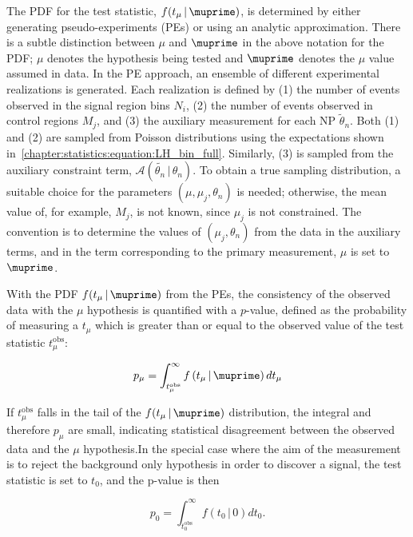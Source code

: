 The PDF for the test statistic, $f(t_{\mu}\,|\,\muprime)$,
is determined by either generating pseudo-experiments (PEs) or using
an analytic approximation. There is a subtle distinction between $\mu$
and $\muprime$
in the above notation for the PDF; $\mu$ denotes the hypothesis being tested and
$\muprime$ denotes the $\mu$ value assumed in data. In the PE
approach, an ensemble
of different experimental realizations is generated. Each realization
is defined by (1) the number of events observed in the signal region
bins $N_i$, (2) the number of events observed in control regions
$M_j$, and (3) the auxiliary measurement for each NP
$\tilde{\theta}_n$. Both (1) and (2) are sampled from Poisson
distributions using the expectations shown
in~\ref{chapter:statistics:equation:LH_bin_full}. Similarly, (3) is sampled from the auxiliary
constraint term, $\mathscr{A}(\tilde{\theta_n}\,|\,\theta_n)$. To obtain a
true sampling distribution, a suitable choice for the parameters
$(\mu,\mu_j,\theta_n)$ is needed; otherwise, the mean value of, for
example, $M_j$, is not known, since $\mu_j$ is not
constrained. The convention is to determine the values of
$(\mu_j,\theta_n)$ from the data in the auxiliary terms, and in the
term corresponding to the primary measurement, $\mu$ is set to
$\muprime$.

With the PDF $f(t_{\mu}\,|\,\muprime)$ from the PEs, the
consistency of the observed data with the $\mu$
hypothesis is quantified with a $p$-value, defined as the probability
of measuring a $t_{\mu}$ which is greater than or equal to the
observed value of the test statistic
$t_{\mu}^{\textrm{obs}}$:

\begin{equation}
p_{\mu} = \int_{t_{\mu}^{\textrm{obs}}}^{\infty}
f\left(t_{\mu}\,|\,\muprime\right) dt_{\mu}
\label{chap:statistics:equation:p_value}
\end{equation}

\noindent
If $t_{\mu}^{\textrm{obs}}$ falls in the tail of the
$f(t_{\mu}\,|\,\muprime)$ distribution, the integral and therefore
$p_{\mu}$ are small, indicating statistical disagreement
between the observed data and the $\mu$ hypothesis.In the special case
where the aim of the measurement is to reject the
background only hypothesis in order to discover a signal, the test
statistic is set to $t_0$, and the p-value is then

\begin{equation}
p_0 = \int_{t_{0}^{\textrm{obs}}}^{\infty}
f\left(t_{0}\,|\,0\right) dt_0.
\label{chap:statistics:equation:p_value_0}
\end{equation}

